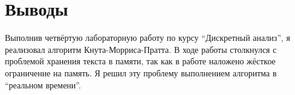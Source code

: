 \section{Выводы}
Выполнив четвёртую лабораторную работу по курсу \enquote{Дискретный анализ}, я реализовал алгоритм Кнута-Морриса-Пратта. В ходе работы
столкнулся с проблемой хранения текста в памяти, так как в работе наложено жёсткое ограничение на память. Я решил эту проблему
выполнением алгоритма в \enquote{реальном времени}.
\pagebreak
